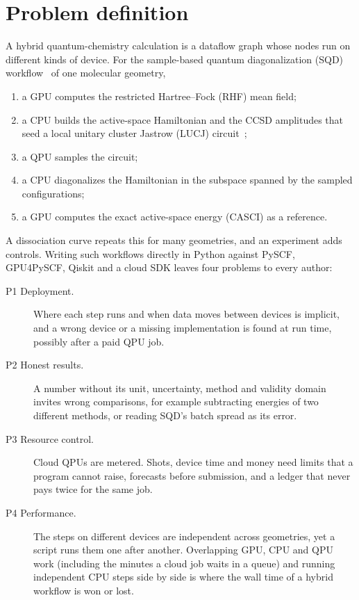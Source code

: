 \documentclass[10pt]{article}
\begin{document}
\tableofcontents

\section{Problem definition}
\label{sec:problem}

A hybrid quantum-chemistry calculation is a dataflow graph whose nodes run on different
kinds of device. For the sample-based quantum diagonalization (SQD)
workflow~\cite{sqd} of one molecular geometry,
\begin{enumerate}
\item a GPU computes the restricted Hartree--Fock (RHF) mean field;
\item a CPU builds the active-space Hamiltonian and the CCSD amplitudes that seed a
local unitary cluster Jastrow (LUCJ) circuit~\cite{lucj};
\item a QPU samples the circuit;
\item a CPU diagonalizes the Hamiltonian in the subspace spanned by the sampled
configurations;
\item a GPU computes the exact active-space energy (CASCI) as a reference.
\end{enumerate}
A dissociation curve repeats this for many geometries, and an experiment adds controls.
Writing such workflows directly in Python against PySCF, GPU4PySCF, Qiskit and a cloud
SDK leaves four problems to every author:

\begin{description}
\item[P1 Deployment.] Where each step runs and when data moves between devices is
implicit, and a wrong device or a missing implementation is found at run time,
possibly after a paid QPU job.
\item[P2 Honest results.] A number without its unit, uncertainty, method and validity
domain invites wrong comparisons, for example subtracting energies of two different
methods, or reading SQD's batch spread as its error.
\item[P3 Resource control.] Cloud QPUs are metered. Shots, device time and money need
limits that a program cannot raise, forecasts before submission, and a ledger that never
pays twice for the same job.
\item[P4 Performance.] The steps on different devices are independent across
geometries, yet a script runs them one after another. Overlapping GPU, CPU and QPU work
(including the minutes a cloud job waits in a queue) and running independent CPU steps
side by side is where the wall time of a hybrid workflow is won or lost.
\end{description}
\end{document}
